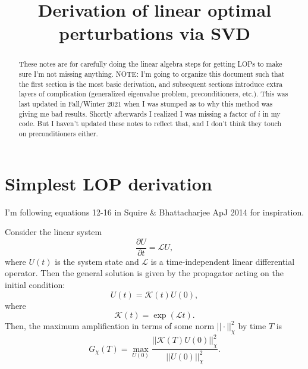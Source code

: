 \documentclass[aps,pop,preprint]{revtex4}
\begin{document}
\title{Derivation of linear optimal perturbations via SVD}
\begin{abstract}
These notes are for carefully doing the linear algebra steps for getting LOPs to make sure I'm not missing anything. 
NOTE: I'm going to organize this document such that the first section is the most basic derivation, and subsequent sections introduce extra layers of complication (generalized eigenvalue problem, preconditioners, etc.). 
This was last updated in Fall/Winter 2021 when I was stumped as to why this method was giving me bad results. 
Shortly afterwards I realized I was missing a factor of $i$ in my code. 
But I haven't updated these notes to reflect that, and I don't think they touch on preconditioners either.
\end{abstract}
\maketitle

\section{Simplest LOP derivation}
\label{sec:simplest}
I'm following equations 12-16 in Squire \& Bhattacharjee ApJ 2014 for inspiration.

Consider the linear system
\begin{equation}
\frac{\partial U}{\partial t} = \mathcal{L} U,
\label{eq:simplest_system}
\end{equation}
where $U(t)$ is the system state and $\mathcal{L}$ is a time-independent linear differential operator.  
Then the general solution is given by the propagator acting on the initial condition:
\begin{equation}
U(t) = \mathcal{K}(t) U(0),
\label{eq:simplest_solution}
\end{equation}
where
\begin{equation}
\mathcal{K}(t) = \exp(\mathcal{L} t).
\label{eq:simplest_propagator}
\end{equation}
Then, the maximum amplification in terms of some norm $|| \cdot ||_\chi^2$ by time $T$ is
\begin{equation}
G_\chi(T) = \max_{U(0)} \frac{|| \mathcal{K}(T) U(0) ||_\chi^2}{||U(0)||_\chi^2}.
\end{equation}
\end{document}
